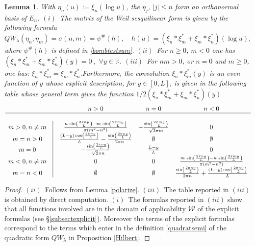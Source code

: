 \documentclass[cupthm]{CUP-JNL-JMJ}
\def\R{{\mathbb R}}
\def\cW{{\mathcal W}}
\def\qqq{\,,\,~\forall}
\numberwithin{equation}{section}
\theoremstyle{cupplain}
\newtheorem{lemma}[theorem]{Lemma}
\theoremstyle{cupdefinition}
\theoremstyle{cupremark}
\theoremstyle{cupproof}
\newtheorem{proof}{Proof}
\begin{document}
 \begin{lemma}\label{polarize2}
 With $\eta_n(u):=\xi_n(\log u)$,  the $\eta_j$, $\vert j\vert\leq n$ form an orthonormal basis of $E_n$.\newline 
  $(i)$~The matrix of the Weil sesquilinear form is given by the following formula 
\begin{equation}\label{weilformbase}
QW_\lambda(\eta_n,\eta_m)=\sigma(n,m)=
\psi^\#(h), \quad h(u)=\left(\xi_n * \xi_m^*+\xi_m*\xi_n^*\right)(\log u),
\end{equation}
 where $\psi^\#(h)$ is defined in \eqref{bombtestsum}.\newline
$(ii)$~For $n\geq 0$, $m< 0$ one has  $
(\xi_n * \xi_m^*+\xi_m*\xi_n^*)(y)=0\qqq y\in \R
$.\newline
$(iii)$~For $nm>0$, or  $n=0$  and $m\geq 0$,  one has: $\xi_n * \xi_m^*=\xi_m*\xi_n^*$.\newline Furthermore, the convolution $\xi_n * \xi_m^*(y)$  is an even function of $y$  whose explicit description, for $y\in [0,L]$, is given in the following table whose general term gives the function $1/2(\xi_n * \xi_m^*+\xi_m*\xi_n^*)(y)$
$$
\begin{array}{ccccc}
& &n>0& n=0 & n<0 \\
\hline\\
m>0,n\neq m &\vline &\frac{n \,\sin \left(\frac{2 \pi  n y}{L}\right)-m \,\sin \left(\frac{2 \pi  m y}{L}\right)}{\pi  \left(m^2-n^2\right)} & -\frac{\sin \left(\frac{2 \pi  m y}{L}\right)}{\sqrt{2} \pi  m} & 0 \\
m=n>0 &\vline & \frac{(L-y) \cos \left(\frac{2 \pi  n y}{L}\right)}{L}-\frac{\sin \left(\frac{2 \pi  n y}{L}\right)}{2 \pi  n} & \emptyset  & \emptyset  \\
m=0&\vline &-\frac{\sin \left(\frac{2 \pi  n y}{L}\right)}{\sqrt{2} \pi  n} & \frac{L-y}{L} & 0 \\
m<0,n\neq m &\vline &0 & 0 & \frac{m\, \sin \left(\frac{2 \pi  n y}{L}\right)-n\, \sin \left(\frac{2 \pi  m y}{L}\right)}{\pi  \left(m^2-n^2\right)} \\
m=n<0 &\vline&\emptyset  & \emptyset  & \frac{\sin \left(\frac{2 \pi  n y}{L}\right)}{2 \pi  n}+\frac{(L-y) \cos \left(\frac{2 \pi  n y}{L}\right)}{L} \\
\end{array}
$$
\end{lemma}
\begin{proof} $(ii)$~Follows from Lemma \ref{polarize}.\newline
 $(iii)$~The table reported in $(iii)$ is obtained by direct computation. \newline
$(i)$~The formulas reported in $(iii)$ show that all functions involved are in the domain of applicability $\cW$ of the explicit formulas (see \S \ref{subsectexplicit}). Moreover the terms of the explicit formulas correspond to the terms which enter in the definition  \eqref{quadratsemi} of the quadratic form $QW_\lambda$ in Proposition \ref{Hilbert}. 
\end{proof}  
\end{document}

